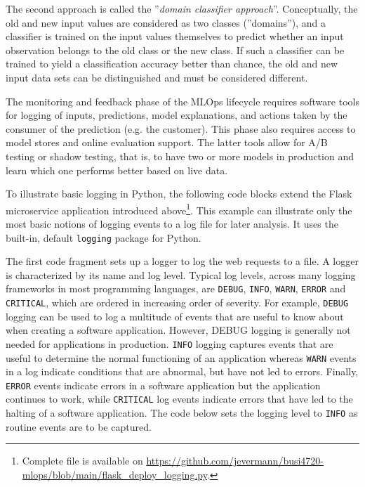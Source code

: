 The second approach is called the ''\emph{domain classifier approach}''. Conceptually, the old and new input values are considered as two classes (''domains''), and a classifier is trained on the input values themselves to predict whether an input observation belongs to the old class or the new class. If such a classifier can be trained to yield a classification accuracy better than chance, the old and new input data sets can be distinguished and must be considered different. 

The monitoring and feedback phase of the MLOps lifecycle requires software tools for logging of inputs, predictions, model explanations, and actions taken by the consumer of the prediction (e.g. the customer). This phase also requires access to model stores and online evaluation support. The latter tools allow for A/B testing or shadow testing, that is, to have two or more models in production and learn which one performs better based on live data. 

To illustrate basic logging in Python, the following code blocks extend the Flask microservice application introduced above\footnote{Complete file is available on \url{https://github.com/jevermann/busi4720-mlops/blob/main/flask_deploy_logging.py}.}. This example can illustrate only the most basic notions of logging events to a log file for later analysis. It uses the built-in, default \texttt{logging} package for Python.

The first code fragment sets up a logger to log the web requests to a file. A logger is characterized by its name and log level. Typical log levels, across many logging frameworks in most programming languages, are \texttt{DEBUG}, \texttt{INFO}, \texttt{WARN}, \texttt{ERROR} and \texttt{CRITICAL}, which are ordered in increasing order of severity. For example, \texttt{DEBUG} logging can be used to log a multitude of events that are useful to know about when creating a software application. However, DEBUG logging is generally not needed for applications in production. \texttt{INFO} logging captures events that are useful to determine the normal functioning of an application whereas \texttt{WARN} events in a log indicate conditions that are abnormal, but have not led to errors. Finally, \texttt{ERROR} events indicate errors in a software application but the application continues to work, while \texttt{CRITICAL} log events indicate errors that have led to the halting of a software application. The code below sets the logging level to \texttt{INFO} as routine events are to be captured. 

